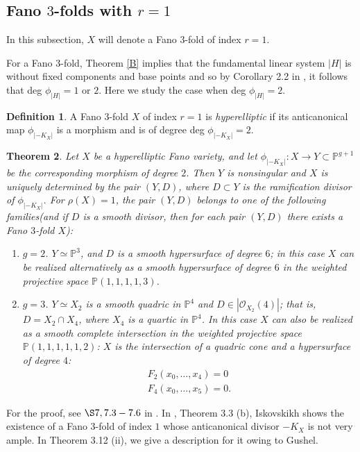 \documentclass[11pt]{amsart}
\theoremstyle{plain}
\newtheorem{theorem}{Theorem}[section]
\theoremstyle{definition}
\newtheorem{definition}[theorem]{Definition}
\theoremstyle{expl}
\begin{document}
\subsection{Fano $3$-folds with $r=1$}
In this subsection, $X$ will denote a Fano $3$-fold of index $r=1$. 

For a Fano $3$-fold, Theorem \ref{B} implies that the fundamental linear system $|H|$ is without fixed components and base points and so by Corollary 2.2 in \cite{Isk77}, it follows that deg $\phi_{|H|} =1$ or $2$. Here we study the case when deg $\phi_{|H|}=2$. 
\begin{definition}
    A Fano $3$-fold $X$ of index $r=1$ is \textit{hyperelliptic} if its anticanonical map $\phi_{|-K_X|}$ is a morphism and is of degree deg $\phi_{|-K_X|} = 2$.
\end{definition}
\begin{theorem}
    Let $X$ be a hyperelliptic Fano variety, and let $\phi_{|-K_X|} : X \to Y \subset \mathbb{P}^{g+1}$ be the corresponding morphism of degree $2$. Then $Y$ is nonsingular and $X$ is uniquely determined by the pair $(Y,D)$, where $D\subset Y$ is the ramification divisor of $\phi_{|-K_X|}$. For $\rho(X)=1$, 
    the pair $(Y,D)$ belongs to one of the following families(and if $D$ is a smooth divisor, then for each pair $(Y,D)$ there exists a Fano $3$-fold $X$):
    \begin{enumerate}
        \item[(i)]$g=2$. $Y \simeq \mathbb{P}^3$, and $D$ is a smooth hypersurface of degree $6$; in this case $X$ can be realized alternatively as a smooth hypersurface of degree $6$ in the weighted projective space $\mathbb{P}(1,1,1,1,3)$. 
        \item[(ii)]$g=3$. $Y \simeq X_2$ is a smooth quadric in $\mathbb{P}^4$ and $D \in |\mathcal{O}_{X_2}(4)|$; that is, $D = X_2 \cap X_4$, where $X_4$ is a quartic in $\mathbb{P}^4$. In this case $X$ can also be realized as a smooth complete intersection in the weighted projective space $\mathbb{P}(1,1,1,1,1,2)$: $X$ is the intersection of a quadric cone and a hypersurface of degree $4$:
        \begin{gather*}
        F_2(x_0,  \dots , x_4)=0 \\
        F_4(x_0, \dots , x_5)=0.
        \end{gather*}
    \end{enumerate}
\end{theorem}
For the proof, see $\S 7, 7.3-7.6$ in \cite{Isk77}.
\medbreak
In \cite{Isk77}, Theorem 3.3 (b), Iskovskikh shows the existence of a Fano $3$-fold of index $1$ whose anticanonical divisor $-K_X$ is not very ample. In Theorem 3.12 (ii), we give a description for it owing to Gushel.
\end{document}
